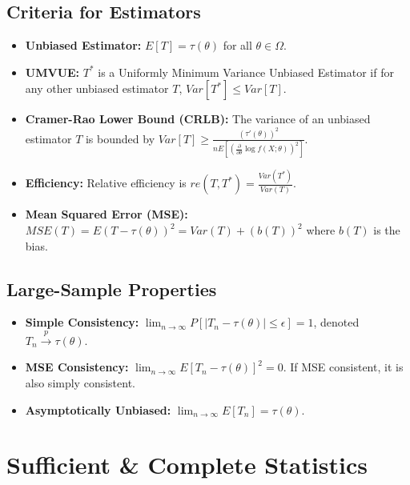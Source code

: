 \documentclass[12pt,a4paper]{article}
\begin{document}
\subsection{Criteria for Estimators}
\begin{defbox}[title=Estimator Properties]
\begin{itemize}
    \item \textbf{Unbiased Estimator:} $E[T] = \tau(\theta)$ for all $\theta \in \Omega$.
    \item \textbf{UMVUE:} $T^*$ is a Uniformly Minimum Variance Unbiased Estimator if for any other unbiased estimator $T$, $Var[T^*] \le Var[T]$.
\end{itemize}
\end{defbox}

\begin{itemize}
    \item \textbf{Cramer-Rao Lower Bound (CRLB):} The variance of an unbiased estimator $T$ is bounded by $Var[T] \ge \frac{(\tau'(\theta))^2}{nE[(\frac{\partial}{\partial\theta}\log f(X;\theta))^2]}$.
    \item \textbf{Efficiency:} Relative efficiency is $re(T,T^*) = \frac{Var(T^*)}{Var(T)}$.
    \item \textbf{Mean Squared Error (MSE):} $MSE(T) = E(T-\tau(\theta))^2 = Var(T) + (b(T))^2$ where $b(T)$ is the bias.
\end{itemize}

\subsection{Large-Sample Properties}
\begin{itemize}
    \item \textbf{Simple Consistency:} $\lim_{n\rightarrow\infty}P[|T_n-\tau(\theta)|\le\epsilon]=1$, denoted $T_n \xrightarrow{p} \tau(\theta)$.
    \item \textbf{MSE Consistency:} $\lim_{n\rightarrow\infty}E[T_n-\tau(\theta)]^2=0$. If MSE consistent, it is also simply consistent.
    \item \textbf{Asymptotically Unbiased:} $\lim_{n\rightarrow\infty}E[T_n] = \tau(\theta)$.
\end{itemize}


\section{Sufficient \& Complete Statistics}
\end{document}
